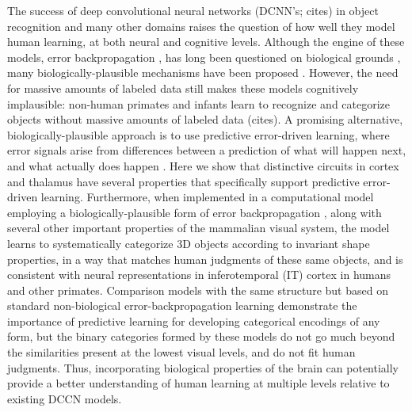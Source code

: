 \documentclass[11pt,twoside]{article}
\newif\myifpdf
\begin{document}
The success of deep convolutional neural networks (DCNN's; cites) in object recognition and many other domains raises the question of how well they model human learning, at both neural and cognitive levels.  Although the engine of these models, error backpropagation \cite{RumelhartHintonWilliams86}, has long been questioned on biological grounds \cite{Crick89}, many biologically-plausible mechanisms have been proposed \cite{OReilly96,etc}.  However, the need for massive amounts of labeled data still makes these models cognitively implausible: non-human primates and infants learn to recognize and categorize objects without massive amounts of labeled data (cites).  A promising alternative, biologically-plausible approach is to use predictive error-driven learning, where error signals arise from differences between a prediction of what will happen next, and what actually does happen \cite{Elman90}.  Here we show that distinctive circuits in cortex and thalamus have several properties that specifically support predictive error-driven learning. Furthermore, when implemented in a computational model employing a biologically-plausible form of error backpropagation \cite{OReilly96,OReillyMunakata00,OReillyMunakataFrankEtAl12}, along with several other important properties of the mammalian visual system, the model learns to systematically categorize 3D objects according to invariant shape properties, in a way that matches human judgments of these same objects, and is consistent with neural representations in inferotemporal (IT) cortex in humans and other primates.  Comparison models with the same structure but based on standard non-biological error-backpropagation learning demonstrate the importance of predictive learning for developing categorical encodings of any form, but the binary categories formed by these models do not go much beyond the similarities present at the lowest visual levels, and do not fit human judgments.  Thus, incorporating biological properties of the brain can potentially provide a better understanding of human learning at multiple levels relative to existing DCCN models.
\end{document}
